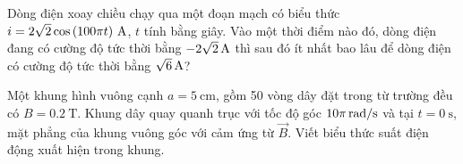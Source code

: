 \begin{ex}
	Dòng điện xoay chiều chạy qua một đoạn mạch có biểu thức $i=\xsi{2\sqrt{2}\cos\left(100\pi t\right)}{\ampere}$, $t$ tính bằng giây. Vào một thời điểm nào đó, dòng điện đang có cường độ tức thời bằng $\xsi{-2\sqrt{2}}{\ampere}$ thì sau đó ít nhất bao lâu để dòng điện có cường độ tức thời bằng $\xsi{\sqrt{6}}{\ampere}$?
\end{ex}
\begin{ex}
	Một khung hình vuông cạnh $a=\SI{5}{\centi\meter}$, gồm 50 vòng dây đặt trong từ trường đều có $B=\SI{0.2}{\tesla}$. Khung dây quay quanh trục với tốc độ góc $\xsi{10\pi}{\radian/\second}$ và tại $t=\SI{0}{\second}$, mặt phẳng của khung vuông góc với cảm ứng từ $\vec{B}$. Viết biểu thức suất điện động xuất hiện trong khung.
\end{ex}












